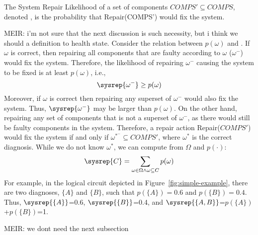\begin{definition}
The System Repair Likelihood of a set of components $COMPS'\subseteq COMPS$, denoted , is the probability that Repair(COMPS') would fix the system.
\end{definition}


MEIR: i'm not sure that the next discussion is such necessity, but i think we should a definition to health state.
Consider the relation between $p(\omega)$ and \sysrep{$\omega$}. If $\omega$ is correct, then repairing all components that are faulty according to $\omega$ ($\omega^{-}$) would fix the system. Therefore, the likelihood of repairing $\omega^{-}$ causing the system to be fixed is at least $p(\omega)$, i.e.,
\[ \sysrep{\omega^{-}}\geq p(\omega)  \]
Moreover, if $\omega$ is correct then repairing any superset of $\omega^{-}$ would also fix the system. Thus, $\sysrep{\omega^{-}}$ may be larger than $p(\omega)$.
On the other hand, repairing any set of components that is not a superset of $\omega^{-}$, as there would still be faulty components in the system.
Therefore, a repair action Repair($COMPS'$) would fix the system if and only if $\omega^{*^{-}}\subseteq COMPS'$, where $\omega^*$ is the correct diagnosis.
While we do not know $\omega^*$, we can compute  from $\Omega$ and $p(\cdot)$:
\[ \sysrep{C} = \sum_{\omega\in \Omega \wedge \omega\subseteq C} p(\omega) \]
For example, in the logical circuit depicted in Figure~\ref{fig:simple-example}, there are two diagnoses, $\{A\}$ and $\{B\}$, such that $p(\{A\})=0.6$ and $p(\{B\})=0.4$. Thus, $\sysrep{\{A\}}$=0.6, $\sysrep{\{B\}}$=0.4, and $\sysrep{\{A,B\}}$=$p(\{A\})$+$p(\{B\})$=1.


MEIR: we dont need the next subsection
